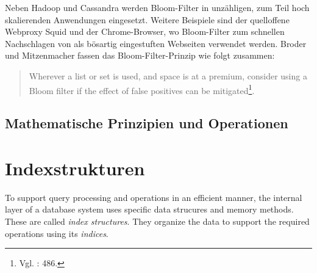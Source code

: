\noindent
Neben Hadoop und Cassandra werden Bloom-Filter in unzähligen, zum Teil hoch skalierenden Anwendungen eingesetzt. Weitere Beispiele sind der quelloffene Webproxy Squid und der Chrome-Browser, wo Bloom-Filter zum schnellen Nachschlagen von als bösartig eingestuften Webseiten verwendet werden. Broder und Mitzenmacher fassen das Bloom-Filter-Prinzip wie folgt zusammen: 
\begin{quote}
Wherever a list or set is used, and space is at a premium, consider using a Bloom filter if the effect of false positives can be mitigated\footnote{Vgl. \cite{Broder2004}: 486.}.
\end{quote}

\subsection{Mathematische Prinzipien und Operationen}\label{sec:mathe}
\section{Indexstrukturen}\label{sec:indexstrukturen}
To support query processing and operations in an efficient manner, the internal layer of a database system uses specific data strucures and memory methods. These are called \textit{index structures}. They organize the data to support the required operations using its \textit{indices}.

